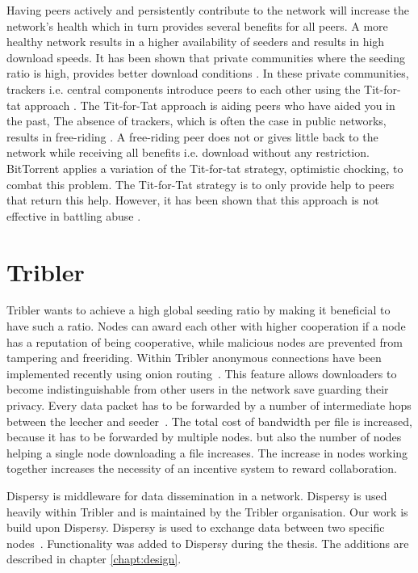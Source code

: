 Having peers actively and persistently contribute to the network will increase the network's health which in turn provides several benefits for all peers.
A more healthy network results in a higher availability of seeders and results in high download speeds.
It has been shown that private communities where the seeding ratio is high, provides better download conditions \cite{meulpolder-privatecommunities}.
In these private communities, trackers i.e. central components introduce peers to each other using the Tit-for-tat approach \cite{cohen-titfortat}.
The Tit-for-Tat approach is aiding peers who have aided you in the past,
The absence of trackers, which is often the case in public networks, results in free-riding \cite{Adar-Freeriding}.
A free-riding peer does not or gives little back to the network while receiving all benefits i.e. download without any restriction.
BitTorrent applies a variation of the Tit-for-tat strategy, optimistic chocking, to combat this problem.
The Tit-for-Tat strategy is to only provide help to peers that return this help.
However, it has been shown that this approach is not effective in battling abuse \cite{Pouwelse-tribler}.

\section{Tribler}
Tribler wants to achieve a high global seeding ratio by making it beneficial to have such a ratio.
Nodes can award each other with higher cooperation if a node has a reputation of being cooperative,
while malicious nodes are prevented from tampering and freeriding.
Within Tribler anonymous connections have been implemented recently using onion routing~\cite{Plak-anonymous,ruigrok-anonymous,tanaskoski-anonymous}.
This feature allows downloaders to become indistinguishable from other users in the network save guarding their privacy.
Every data packet has to be forwarded
by a number of intermediate hops between the leecher and seeder~\cite{Plak-anonymous,tanaskoski-anonymous}.
The total cost of bandwidth per file is increased,
because it has to be forwarded by multiple nodes.
but also the number of nodes helping a single node downloading a file increases.
The increase in nodes working together increases the necessity of an incentive system to reward collaboration.

Dispersy is middleware for data dissemination in a network.
Dispersy is used heavily within Tribler and is maintained by the Tribler organisation.
Our work is build upon Dispersy.
Dispersy is used to exchange data between two specific nodes~\cite{zeilemaker-dispersy}.
Functionality was added to Dispersy during the thesis.
The additions are described in chapter \ref{chapt:design}.

